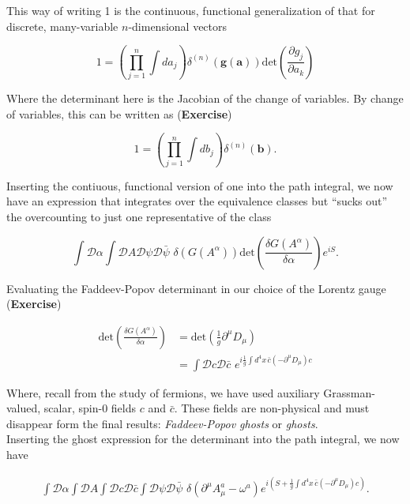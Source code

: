 \noindent This way of writing 1 is the continuous, functional generalization of that for discrete, many-variable $n$-dimensional vectors

\begin{equation}
1 = \left( \prod_{j=1}^n \int d a_j \right) \delta^{(n)} (\textbf{g}(\textbf{a})) \text{det} \left( \frac{\partial g_j}{\partial a_k} \right)
\end{equation}

\noindent Where the determinant here is the Jacobian of the change of variables. By change of variables, this can be written as (\textbf{Exercise})

\begin{equation}
1 = \left( \prod_{j=1}^n \int d b_j \right) \delta^{(n)} (\textbf{b}).
\end{equation}

\noindent Inserting the contiuous, functional version of one into the path integral, we now have an expression that integrates over the equivalence classes but ``sucks out'' the overcounting to just one representative of the class

\begin{equation}
\int \mathcal{D} \alpha \int \mathcal{D} A \mathcal{D} \psi \mathcal{D} \bar{\psi} \,\, \delta(G(A^\alpha)) \text{det} \left( \frac{\delta G(A^\alpha)}{\delta \alpha} \right) e^{i S}.
\end{equation}

\noindent Evaluating the Faddeev-Popov determinant in our choice of the Lorentz gauge (\textbf{Exercise})

\begin{align}
\text{det} \left( \frac{\delta G(A^\alpha)}{\delta \alpha} \right) &= \text{det} \left( \frac{1}{g} \partial^\mu D_\mu \right) \\
&= \int \mathcal{D} c \mathcal{D} \bar{c} \,\, e^{i \frac{1}{g} \int d^4 x \, \bar{c} (-\partial^\mu D_\mu) c}
\end{align}

\noindent Where, recall from the study of fermions, we have used auxiliary Grassman-valued, scalar, spin-0 fields $c$ and $\bar{c}$. These fields are non-physical and must disappear form the final results: \textit{Faddeev-Popov ghosts} or \textit{ghosts}. \\

\noindent Inserting the ghost expression for the determinant into the path integral, we now have

\begin{align}
\int \mathcal{D} \alpha \int \mathcal{D} A \int \mathcal{D} c \mathcal{D} \bar{c} \int \mathcal{D} \psi \mathcal{D} \bar{\psi} \,\, \delta( \partial^\mu A^a_\mu - \omega^a ) e^{i (S + \frac{1}{g} \int d^4 x \, \bar{c} (-\partial^\mu D_\mu) c)}.
\end{align}

